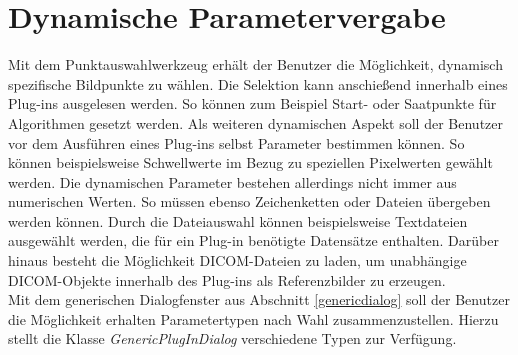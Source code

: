 \section{Dynamische Parametervergabe} \label{dynamicParameter}

Mit dem Punktauswahlwerkzeug erhält der Benutzer die Möglichkeit, dynamisch spezifische Bildpunkte zu wählen. Die Selektion kann anschießend innerhalb eines Plug-ins ausgelesen werden. So können zum Beispiel Start- oder Saatpunkte für Algorithmen gesetzt werden. Als weiteren dynamischen Aspekt soll der Benutzer vor dem Ausführen eines Plug-ins selbst Parameter bestimmen können. So können beispielsweise Schwellwerte im Bezug zu speziellen Pixelwerten gewählt werden. Die dynamischen Parameter bestehen allerdings nicht immer aus numerischen Werten. So müssen ebenso Zeichenketten oder Dateien übergeben werden können. Durch die Dateiauswahl können beispielsweise Textdateien ausgewählt werden, die für ein Plug-in benötigte Datensätze enthalten. Darüber hinaus besteht die Möglichkeit DICOM-Dateien zu laden, um unabhängige DICOM-Objekte innerhalb des Plug-ins als Referenzbilder zu erzeugen.\\
Mit dem generischen Dialogfenster aus Abschnitt \ref{genericdialog} soll der Benutzer die Möglichkeit erhalten Parametertypen nach Wahl zusammenzustellen. Hierzu stellt die Klasse \textit{GenericPlugInDialog} verschiedene Typen zur Verfügung.

